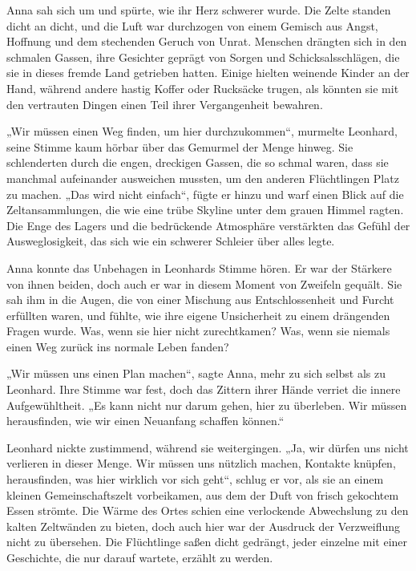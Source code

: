 \documentclass[
]{article}
\begin{document}
Anna sah sich um und spürte, wie ihr Herz schwerer wurde. Die Zelte
standen dicht an dicht, und die Luft war durchzogen von einem Gemisch
aus Angst, Hoffnung und dem stechenden Geruch von Unrat. Menschen
drängten sich in den schmalen Gassen, ihre Gesichter geprägt von Sorgen
und Schicksalsschlägen, die sie in dieses fremde Land getrieben hatten.
Einige hielten weinende Kinder an der Hand, während andere hastig Koffer
oder Rucksäcke trugen, als könnten sie mit den vertrauten Dingen einen
Teil ihrer Vergangenheit bewahren.

„Wir müssen einen Weg finden, um hier durchzukommen``, murmelte
Leonhard, seine Stimme kaum hörbar über das Gemurmel der Menge hinweg.
Sie schlenderten durch die engen, dreckigen Gassen, die so schmal waren,
dass sie manchmal aufeinander ausweichen mussten, um den anderen
Flüchtlingen Platz zu machen. „Das wird nicht einfach``, fügte er hinzu
und warf einen Blick auf die Zeltansammlungen, die wie eine trübe
Skyline unter dem grauen Himmel ragten. Die Enge des Lagers und die
bedrückende Atmosphäre verstärkten das Gefühl der Ausweglosigkeit, das
sich wie ein schwerer Schleier über alles legte.

Anna konnte das Unbehagen in Leonhards Stimme hören. Er war der Stärkere
von ihnen beiden, doch auch er war in diesem Moment von Zweifeln
gequält. Sie sah ihm in die Augen, die von einer Mischung aus
Entschlossenheit und Furcht erfüllten waren, und fühlte, wie ihre eigene
Unsicherheit zu einem drängenden Fragen wurde. Was, wenn sie hier nicht
zurechtkamen? Was, wenn sie niemals einen Weg zurück ins normale Leben
fanden?

„Wir müssen uns einen Plan machen``, sagte Anna, mehr zu sich selbst als
zu Leonhard. Ihre Stimme war fest, doch das Zittern ihrer Hände verriet
die innere Aufgewühltheit. „Es kann nicht nur darum gehen, hier zu
überleben. Wir müssen herausfinden, wie wir einen Neuanfang schaffen
können.``

Leonhard nickte zustimmend, während sie weitergingen. „Ja, wir dürfen
uns nicht verlieren in dieser Menge. Wir müssen uns nützlich machen,
Kontakte knüpfen, herausfinden, was hier wirklich vor sich geht``,
schlug er vor, als sie an einem kleinen Gemeinschaftszelt vorbeikamen,
aus dem der Duft von frisch gekochtem Essen strömte. Die Wärme des Ortes
schien eine verlockende Abwechslung zu den kalten Zeltwänden zu bieten,
doch auch hier war der Ausdruck der Verzweiflung nicht zu übersehen. Die
Flüchtlinge saßen dicht gedrängt, jeder einzelne mit einer Geschichte,
die nur darauf wartete, erzählt zu werden.
\end{document}
